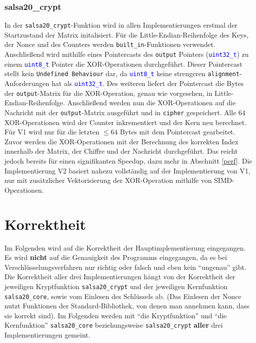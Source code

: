 \documentclass[course=erap]{aspdoc}
\begin{document}
\subsubsection{salsa20\_crypt} \label{crypt}
In der \texttt{salsa20\_crypt}-Funktion wird in allen Implementierungen erstmal der Start\-zustand der Matrix initalisiert. Für die Little-Endian-Reihenfolge des Keys, der Nonce und des Counters werden \texttt{built\_in}-Funktionen verwendet.
Anschließend wird mithilfe eines Pointercasts des \texttt{output} Pointers (\texttt{\textcolor{blue}{uint32\_t}}) zu einem \texttt{\textcolor{blue}{uint8\_t}} Pointer die XOR-Operationen durchgeführt. Dieser Pointercast stellt kein \texttt{Undefined Behaviour} dar, 
da \texttt{\textcolor{blue}{uint8\_t}} keine strengeren \texttt{alignment}-Anforderungen hat als \texttt{\textcolor{blue}{uint32\_t}}. Des weiteren liefert der Pointercast die Bytes der \texttt{output}-Matrix für die XOR-Operation, genau wie vorgesehen, in Little-Endian-Reihenfolge.
Anschließend werden nun die XOR-Operationen auf die Nachricht mit der \texttt{output}-Matrix ausgeführt und in \texttt{cipher} gespeichert. Alle 64 XOR-Operationen wird der Counter inkrementiert und der Kern neu berechnet. Für V1 wird nur für die letzten $\leq 64$ Bytes mit dem Pointercast gearbeitet.
Zuvor werden die XOR-Operationen mit der Berechnung des korrekten Index innerhalb der Matrix, der Chiffre und der Nachricht durchgeführt. Das reicht jedoch bereits für einen signifikanten Speedup, dazu mehr in Abschnitt \ref{perf}.
Die Implementierung V2 basiert nahezu vollständig auf der Implementierung von V1, nur mit zusätzlicher Vektorisierung der XOR-Operation mithilfe von SIMD-Operationen.


\section{Korrektheit}
Im Folgenden wird auf die Korrektheit der Hauptimplementierung eingegangen.
Es wird \textbf{nicht} auf die Genauigkeit des Programms eingegangen, da es bei Ver\-schlüsse\-lungsverfahren
nur richtig oder falsch und eben kein ``ungenau'' gibt.
\\
Die Korrektheit aller drei Implementierungen hängt von der Korrektheit der jeweiligen Kryptfunktion \texttt{salsa20\_crypt} 
und der jeweiligen Kernfunktion \texttt{salsa20\_core}, sowie vom Einlesen des Schlüssels ab. (Das Einlesen der Nonce nutzt 
Funktionen der Standard-Bibliothek, von denen man annehmen kann, dass sie korrekt sind). Im Folgenden werden mit ``die Kryptfunktion''
und ``die Kernfunktion'' \texttt{salsa20\_core} beziehungsweise \texttt{salsa20\_crypt} \textbf{aller} drei Implementierungen gemeint.
\end{document}
